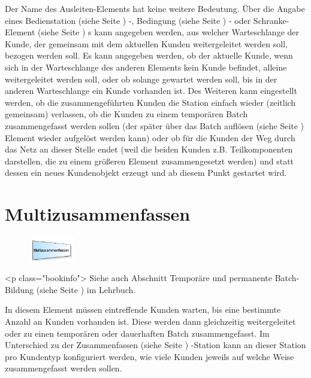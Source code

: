 Der Name des Ausleiten-Elements hat keine weitere Bedeutung. Über die Angabe eines 
Bedienstation (siehe Seite \pageref{ref:ModelElementProcess}) -, Bedingung (siehe Seite \pageref{ref:ModelElementHold}) -
oder Schranke-Element (siehe Seite \pageref{ref:ModelElementBarrier}) s kann angegeben werden, aus welcher Warteschlange
der Kunde, der gemeinsam mit dem aktuellen Kunden weitergeleitet werden soll, bezogen werden soll.
Es kann angegeben werden, ob der aktuelle Kunde, wenn sich in der Warteschlange des anderen Elements kein
Kunde befindet, alleine weitergeleitet werden soll, oder ob solange gewartet werden soll, bis in der
anderen Warteschlange ein Kunde vorhanden ist. Des Weiteren kann eingestellt werden,
ob die zusammengeführten Kunden die Station einfach wieder (zeitlich gemeinsam) verlassen, ob die Kunden zu einem temporären
Batch zusammengefasst werden sollen (der später über das Batch auflösen (siehe Seite \pageref{ref:ModelElementSeparate}) Element
wieder aufgelöst werden kann) oder ob für die Kunden der Weg durch
das Netz an dieser Stelle endet (weil die beiden Kunden z.B. Teilkomponenten darstellen, die zu einem größeren Element
zusammengesetzt werden) und statt dessen ein neues Kundenobjekt erzeugt und ab diesem Punkt gestartet wird. 


\section{Multizusammenfassen}
\label{ref:ModelElementBatchMulti}

\begin{figure}
\vspace{-22pt}
\includegraphics[width=2cm]{imageModelElementBatchMulti.png}
\vspace{-22pt}
\end{figure}

<p class="bookinfo">
Siehe auch Abschnitt Temporäre und permanente Batch-Bildung (siehe Seite \pageref{ref:book:8.2.5}) im Lehrbuch.

In diesem Element müssen eintreffende Kunden warten, bis eine bestimmte Anzahl an Kunden vorhanden ist.
Diese werden dann gleichzeitig weitergeleitet oder zu einen temporären oder dauerhaften Batch zusammengefasst.
Im Unterschied zu der Zusammenfassen (siehe Seite \pageref{ref:ModelElementBatch}) -Station kann an dieser Station
pro Kundentyp konfiguriert werden, wie viele Kunden jeweils auf welche Weise zusammengefasst werden sollen.


